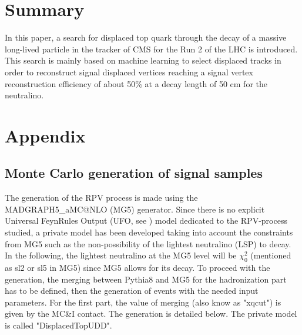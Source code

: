 \documentclass{cernatlasnote}
\begin{document}
\newpage
\section{Summary}

In this paper, a search for displaced top quark through the decay of a massive long-lived particle in the tracker of CMS for the Run 2 of the LHC is introduced. This search is mainly based on machine learning to select displaced tracks in order to reconstruct signal displaced vertices reaching a signal vertex reconstruction efficiency of about 50\% at a decay length of 50 cm for the neutralino.

\label{SEC: SUM}

\newpage
\section{Appendix}
\label{SEC: APP}

\subsection{Monte Carlo generation of signal samples}
\label{APP: GEN}
The generation of the RPV process is made using the MADGRAPH5\_aMC@NLO (MG5) generator. Since there is no explicit Universal FeynRules Output (UFO, see \cite{UFO}) model dedicated to the RPV-process studied, a private model has been developed taking into account the constraints from MG5 such as the non-possibility of the lightest neutralino (LSP) to decay. In the following, the lightest neutralino at the MG5 level will be $\chi^2_{0}$ (mentioned as sl2 or sl5 in MG5) since MG5 allows for its decay. To proceed with the generation, the merging between Pythia8 \cite{bierlich2022comprehensive} and MG5 for the hadronization part has to be defined, then the generation of events with the needed input parameters.
For the first part, the value of merging (also know as "xqcut") is given by the MC\&I contact. The generation is detailed below. The private model is called "DisplacedTopUDD".
\end{document}
